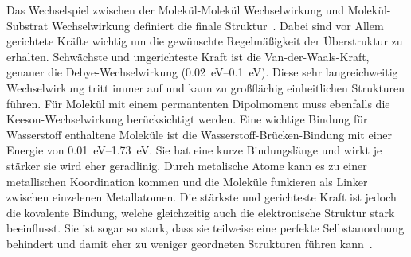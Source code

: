             Das Wechselspiel zwischen der Molekül-Molekül Wechselwirkung und Molekül-Substrat Wechselwirkung definiert die finale Struktur~\cite{IF_1}.
            Dabei sind vor Allem gerichtete Kräfte wichtig um die gewünschte Regelmäßigkeit der Überstruktur zu erhalten.
            Schwächste und ungerichteste Kraft ist die Van-der-Waals-Kraft, genauer die Debye-Wechselwirkung (\SIrange{0.02}{0.1}{\electronvolt}).
            Diese sehr langreichweitig Wechselwirkung tritt immer auf und kann zu großflächig einheitlichen Strukturen führen.
            Für Molekül mit einem permantenten Dipolmoment muss ebenfalls die Keeson-Wechselwirkung berücksichtigt werden.
            Eine wichtige Bindung für Wasserstoff enthaltene Moleküle ist die Wasserstoff-Brücken-Bindung mit einer Energie von \SIrange{0.01}{1.73}{\electronvolt}.
            Sie hat eine kurze Bindungslänge und wirkt je stärker sie wird eher geradlinig.
            Durch metalische Atome kann es zu einer metallischen Koordination kommen und die Moleküle funkieren als Linker zwischen einzelenen Metallatomen. %
            Die stärkste und gerichteste Kraft ist jedoch die kovalente Bindung, welche gleichzeitig auch die elektronische Struktur stark beeinflusst.
            Sie ist sogar so stark, dass sie teilweise eine perfekte Selbstanordnung behindert und damit eher zu weniger geordneten Strukturen führen kann~\cite{IF_1}.

